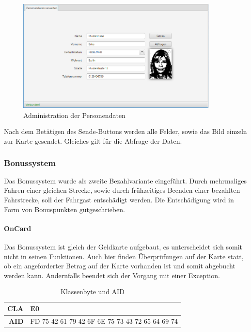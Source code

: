 \documentclass[	a4paper,
			11pt,
			oneside,
			parskip]{scrartcl}
\begin{document}
\begin{figure}[H]
	\centering
  	\includegraphics[width=0.9\textwidth]{img/pers}
	\caption{Administration der Personendaten}
	\label{pers}
\end{figure}

Nach dem Betätigen des Sende-Buttons werden alle Felder, sowie das Bild einzeln zur Karte gesendet. Gleiches gilt für die Abfrage der Daten.	
	
\subsubsection{Bonussystem}	

Das Bonussystem wurde als zweite Bezahlvariante eingeführt. Durch mehrmaliges Fahren einer gleichen Strecke, sowie durch frühzeitiges Beenden einer bezahlten Fahrstrecke, soll der Fahrgast entschädigt werden. Die Entschädigung wird in Form von Bonuspunkten gutgeschrieben. \medskip

\paragraph{OnCard} Das Bonussystem ist gleich der Geldkarte aufgebaut, es unterscheidet sich somit nicht in seinen Funktionen. Auch hier finden Überprüfungen auf der Karte statt, ob ein angeforderter Betrag auf der Karte vorhanden ist und somit abgebucht werden kann. Andernfalls beendet sich der Vorgang mit einer Exception.

\begin{table}[htbp]
  \centering
  \caption{Klassenbyte und AID}
    \begin{tabular}{rr}
    \toprule
    \textbf{CLA} & \multicolumn{1}{l}{E0} \\
    \midrule
    \textbf{AID} & FD 75 42 61 79 42 6F 6E 75 73 43 72 65 64 69 74 \\
    \bottomrule
    \end{tabular}%
  \label{tab:bonusaid}%
\end{table}%
\end{document}
